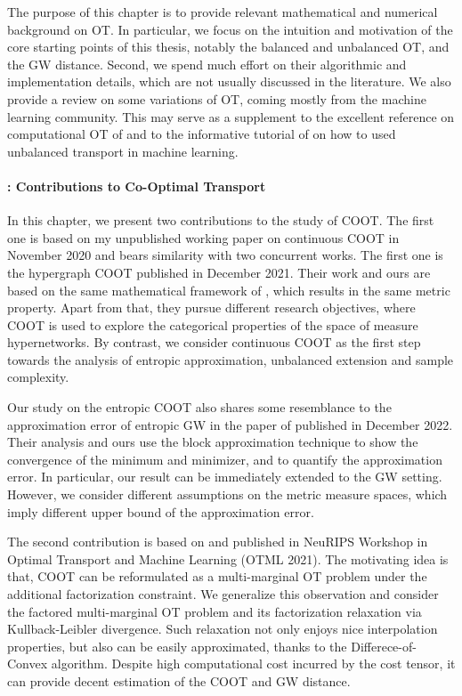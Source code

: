 The purpose of this chapter is to provide relevant mathematical and numerical background
on OT. In particular, we focus on the intuition and motivation of the core starting points
of this thesis, notably the balanced and unbalanced OT, and the GW distance.
Second, we spend much effort on their algorithmic and implementation details, which are not
usually discussed in the literature. We also provide a review on some variations of OT,
coming mostly from the machine learning community. This may serve as a supplement
to the excellent reference on computational OT of \citet{Peyre19} and to the informative
tutorial of \citet{Sejourne22} on how to used unbalanced transport in machine learning.

\paragraph{: Contributions to Co-Optimal Transport}

In this chapter, we present two contributions to the study of COOT.
The first one is based on my unpublished working paper
on continuous COOT in November 2020 and bears similarity with two concurrent works.
The first one is the hypergraph COOT \citep{Chowdhury21b} published in December 2021.
Their work and ours are based on the same mathematical framework of \citet{Chowdhury19},
which results in the same metric property. Apart from that, they pursue different research objectives,
where COOT is used to explore the categorical properties of the space of measure hypernetworks.
By contrast, we consider continuous COOT as the first step towards the analysis of
entropic approximation, unbalanced extension and sample complexity.

Our study on the entropic COOT also shares some resemblance to the approximation error of
entropic GW in the paper of \citet{Zhang23} published in December 2022.
Their analysis and ours use the block approximation technique \citep{Carlier17}
to show the convergence of the minimum and minimizer, and to quantify the approximation error.
In particular, our result can be immediately extended to the GW setting. However,
we consider different assumptions on the metric measure spaces,
which imply different upper bound of the approximation error.

The second contribution is based on \citep{Tran21} and published in NeuRIPS Workshop in Optimal
Transport and Machine Learning (OTML 2021). The motivating idea is that,
COOT can be reformulated as a multi-marginal OT problem under the additional factorization constraint.
We generalize this observation and consider the factored multi-marginal OT problem
and its factorization relaxation via Kullback-Leibler divergence.
Such relaxation not only enjoys nice interpolation properties, but also
can be easily approximated, thanks to the Differece-of-Convex algorithm.
Despite high computational cost incurred by the cost tensor,
it can provide decent estimation of the COOT and GW distance.

